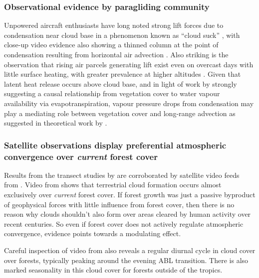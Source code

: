 \subsubsection{Observational evidence by paragliding community}
\label{sssec:paraglide}

Unpowered aircraft enthusiasts have long noted strong lift forces due to condensation near cloud base in a phenomenon known as “cloud suck” \citep{gadd_thermals, pagen1992, pagen2001}, with close-up video evidence also showing a thinned column at the point of condensation resulting from horizontal air advection \citep{benz2021_read}. Also striking is the observation that rising air parcels generating lift exist even on overcast days with little surface heating, with greater prevalence at higher altitudes \citep{rejmanek2018, benz2021_full}. Given that latent heat release occurs above cloud base, and in light of work by \citet{gordon2003, jiang2013, yan2013, zhang2016} strongly suggesting a causal relationship from vegetation cover to water vapour availability via evapotranspiration, vapour pressure drops from condensation may play a mediating role between vegetation cover and long-range advection as suggested in theoretical work by \citet{makarieva2013}.

\subsubsection{Satellite observations display preferential atmospheric convergence over \textit{current} forest cover}

Results from the transect studies by \citet{makarieva2009_evidence, makarieva2013_revisiting} are corroborated by satellite video feeds from \citet{eumetstat}. Video from \citet{eumetstat} shows that terrestrial cloud formation occurs almost exclusively over \textit{current} forest cover. If forest growth was just a passive byproduct of geophysical forces with little influence from forest cover, then there is no reason why clouds shouldn't also form over areas cleared by human activity over recent centuries. So even if forest cover does not actively regulate atmospheric convergence, evidence points towards a modulating effect.

Careful inspection of video from \citet{eumetstat} also reveals a regular diurnal cycle in cloud cover over forests, typically peaking around the evening \ac{ABL} transition. There is also marked seasonality in this cloud cover for forests outside of the tropics.

